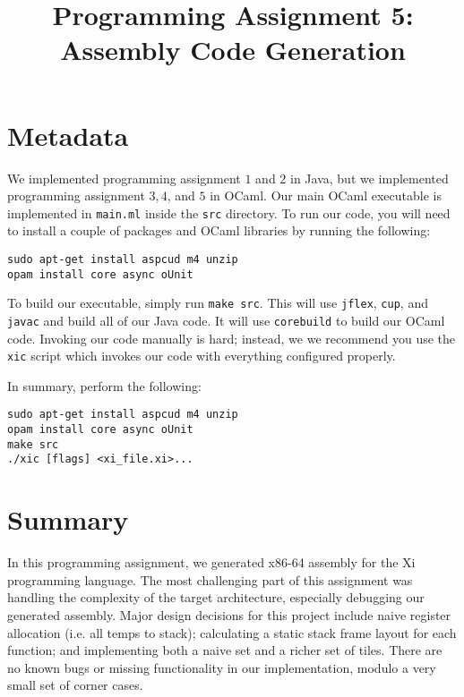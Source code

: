 \documentclass{hw}
\title{Programming Assignment 5:\\ Assembly Code Generation}
\begin{document}
\maketitle

\section{Metadata}\label{sec:metadata}
We implemented programming assignment $1$ and $2$ in Java, but we implemented
programming assignment $3,4$, and $5$ in OCaml. Our main OCaml executable is
implemented in \texttt{main.ml} inside the \texttt{src} directory. To run our
code, you will need to install a couple of packages and OCaml libraries by
running the following:

\begin{center}
\begin{BVerbatim}
sudo apt-get install aspcud m4 unzip
opam install core async oUnit
\end{BVerbatim}
\end{center}

To build our executable, simply run \texttt{make src}. This will use
\texttt{jflex}, \texttt{cup}, and \texttt{javac} and build all of our Java
code. It will use \texttt{corebuild} to build our OCaml code. Invoking our
code manually is hard; instead, we we recommend you use the \texttt{xic} script
which invokes our code with everything configured properly.

In summary, perform the following:

\begin{center}
\begin{BVerbatim}
sudo apt-get install aspcud m4 unzip
opam install core async oUnit
make src
./xic [flags] <xi_file.xi>...
\end{BVerbatim}
\end{center}

\section{Summary}\label{sec:summary}
In this programming assignment, we generated x86-64 assembly for the Xi programming language.
The most challenging part of this assignment was handling the complexity of the target
architecture, especially debugging our generated assembly. Major design decisions for this
project include naive register allocation (i.e. all temps to stack); calculating a static
stack frame layout for each function; and implementing both a naive set and a richer set of
tiles. There are no known bugs or missing functionality in our implementation, modulo a very
small set of corner cases.
\end{document}
